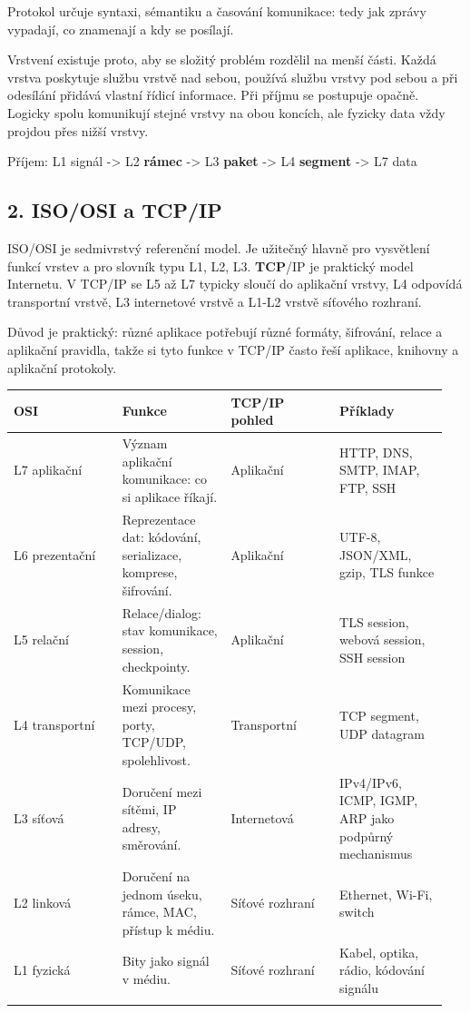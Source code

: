 Protokol určuje syntaxi, sémantiku a časování komunikace: tedy jak zprávy vypadají, co znamenají a kdy se posílají.

Vrstvení existuje proto, aby se složitý problém rozdělil na menší části. Každá vrstva poskytuje službu vrstvě nad sebou, používá službu vrstvy pod sebou a při odesílání přidává vlastní řídicí informace. Při příjmu se postupuje opačně. Logicky spolu komunikují stejné vrstvy na obou koncích, ale fyzicky data vždy projdou přes nižší vrstvy.

Příjem: L1 signál -> L2 \textbf{rámec} -> L3 \textbf{paket} -> L4 \textbf{segment} -> L7 data

\subsection*{2. ISO/OSI a TCP/IP}

ISO/OSI je sedmivrstvý referenční model. Je užitečný hlavně pro vysvětlení funkcí vrstev a pro slovník typu L1, L2, L3. \textbf{TCP}/IP je praktický model Internetu. V TCP/IP se L5 až L7 typicky sloučí do aplikační vrstvy, L4 odpovídá transportní vrstvě, L3 internetové vrstvě a L1-L2 vrstvě síťového rozhraní.

Důvod je praktický: různé aplikace potřebují různé formáty, šifrování, relace a aplikační pravidla, takže si tyto funkce v TCP/IP často řeší aplikace, knihovny a aplikační protokoly.

\begin{longtable}{p{0.237\linewidth}p{0.237\linewidth}p{0.237\linewidth}p{0.237\linewidth}}
\toprule
\textbf{OSI} & \textbf{Funkce} & \textbf{TCP/IP pohled} & \textbf{Příklady} \\
\midrule\endhead
L7 aplikační & Význam aplikační komunikace: co si aplikace říkají. & Aplikační & HTTP, DNS, SMTP, IMAP, FTP, SSH \\
\addlinespace
L6 prezentační & Reprezentace dat: kódování, serializace, komprese, šifrování. & Aplikační & UTF-8, JSON/XML, gzip, TLS funkce \\
\addlinespace
L5 relační & Relace/dialog: stav komunikace, session, checkpointy. & Aplikační & TLS session, webová session, SSH session \\
\addlinespace
L4 transportní & Komunikace mezi procesy, porty, TCP/UDP, spolehlivost. & Transportní & TCP segment, UDP datagram \\
\addlinespace
L3 síťová & Doručení mezi sítěmi, IP adresy, směrování. & Internetová & IPv4/IPv6, ICMP, IGMP, ARP jako podpůrný mechanismus \\
\addlinespace
L2 linková & Doručení na jednom úseku, rámce, MAC, přístup k médiu. & Síťové rozhraní & Ethernet, Wi-Fi, switch \\
\addlinespace
L1 fyzická & Bity jako signál v médiu. & Síťové rozhraní & Kabel, optika, rádio, kódování signálu \\
\addlinespace
\bottomrule
\end{longtable}

